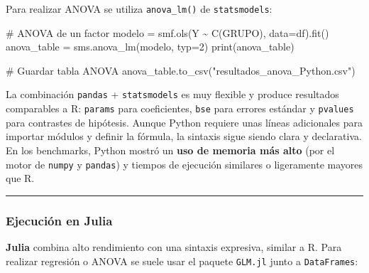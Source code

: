 \documentclass[
  letterpaper,
  DIV=11,
  numbers=noendperiod]{scrartcl}
\newenvironment{Shaded}{\begin{snugshade}}{\end{snugshade}}
\newcommand{\BuiltInTok}[1]{\textcolor[rgb]{0.00,0.23,0.31}{#1}}
\newcommand{\CommentTok}[1]{\textcolor[rgb]{0.37,0.37,0.37}{#1}}
\newcommand{\DecValTok}[1]{\textcolor[rgb]{0.68,0.00,0.00}{#1}}
\newcommand{\NormalTok}[1]{\textcolor[rgb]{0.00,0.23,0.31}{#1}}
\newcommand{\OperatorTok}[1]{\textcolor[rgb]{0.37,0.37,0.37}{#1}}
\newcommand{\StringTok}[1]{\textcolor[rgb]{0.13,0.47,0.30}{#1}}
\begin{document}
Para realizar ANOVA se utiliza \texttt{anova\_lm()} de
\texttt{statsmodels}:

\begin{Shaded}
\begin{Highlighting}[]
\CommentTok{\# ANOVA de un factor}
\NormalTok{modelo }\OperatorTok{=}\NormalTok{ smf.ols(}\StringTok{\textquotesingle{}Y \textasciitilde{} C(GRUPO)\textquotesingle{}}\NormalTok{, data}\OperatorTok{=}\NormalTok{df).fit()}
\NormalTok{anova\_table }\OperatorTok{=}\NormalTok{ sms.anova\_lm(modelo, typ}\OperatorTok{=}\DecValTok{2}\NormalTok{)}
\BuiltInTok{print}\NormalTok{(anova\_table)}

\CommentTok{\# Guardar tabla ANOVA}
\NormalTok{anova\_table.to\_csv(}\StringTok{"resultados\_anova\_Python.csv"}\NormalTok{)}
\end{Highlighting}
\end{Shaded}

La combinación \texttt{pandas} + \texttt{statsmodels} es muy flexible y
produce resultados comparables a R: \texttt{params} para coeficientes,
\texttt{bse} para errores estándar y \texttt{pvalues} para contrastes de
hipótesis. Aunque Python requiere unas líneas adicionales para importar
módulos y definir la fórmula, la sintaxis sigue siendo clara y
declarativa. En los benchmarks, Python mostró un \textbf{uso de memoria
más alto} (por el motor de \texttt{numpy} y \texttt{pandas}) y tiempos
de ejecución similares o ligeramente mayores que R.

\begin{center}\rule{0.5\linewidth}{0.5pt}\end{center}

\subsubsection{\texorpdfstring{\textbf{Ejecución en
Julia}}{Ejecución en Julia}}\label{ejecuciuxf3n-en-julia}

\textbf{Julia} combina alto rendimiento con una sintaxis expresiva,
similar a R. Para realizar regresión o ANOVA se suele usar el paquete
\texttt{GLM.jl} junto a \texttt{DataFrames}:
\end{document}
